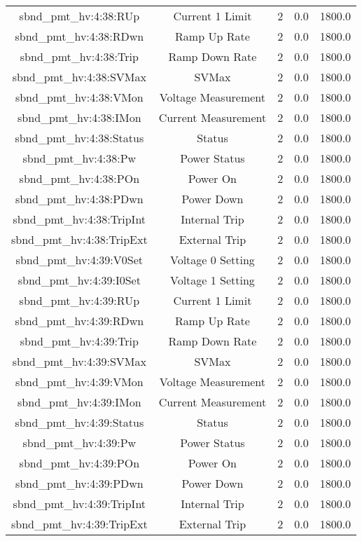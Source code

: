 \begin{center}
\begin{longtable}{c | c c c c }
sbnd\_pmt\_hv:4:38:RUp & Current 1 Limit & 2 & 0.0 & 1800.0\\ 
sbnd\_pmt\_hv:4:38:RDwn & Ramp Up Rate & 2 & 0.0 & 1800.0\\ 
sbnd\_pmt\_hv:4:38:Trip & Ramp Down Rate & 2 & 0.0 & 1800.0\\ 
sbnd\_pmt\_hv:4:38:SVMax & SVMax & 2 & 0.0 & 1800.0\\ 
sbnd\_pmt\_hv:4:38:VMon & Voltage Measurement & 2 & 0.0 & 1800.0\\ 
sbnd\_pmt\_hv:4:38:IMon & Current Measurement & 2 & 0.0 & 1800.0\\ 
sbnd\_pmt\_hv:4:38:Status & Status & 2 & 0.0 & 1800.0\\ 
sbnd\_pmt\_hv:4:38:Pw & Power Status & 2 & 0.0 & 1800.0\\ 
sbnd\_pmt\_hv:4:38:POn & Power On & 2 & 0.0 & 1800.0\\ 
sbnd\_pmt\_hv:4:38:PDwn & Power Down & 2 & 0.0 & 1800.0\\ 
sbnd\_pmt\_hv:4:38:TripInt & Internal Trip & 2 & 0.0 & 1800.0\\ 
sbnd\_pmt\_hv:4:38:TripExt & External Trip & 2 & 0.0 & 1800.0\\ 
sbnd\_pmt\_hv:4:39:V0Set & Voltage 0 Setting & 2 & 0.0 & 1800.0\\ 
sbnd\_pmt\_hv:4:39:I0Set & Voltage 1 Setting & 2 & 0.0 & 1800.0\\ 
sbnd\_pmt\_hv:4:39:RUp & Current 1 Limit & 2 & 0.0 & 1800.0\\ 
sbnd\_pmt\_hv:4:39:RDwn & Ramp Up Rate & 2 & 0.0 & 1800.0\\ 
sbnd\_pmt\_hv:4:39:Trip & Ramp Down Rate & 2 & 0.0 & 1800.0\\ 
sbnd\_pmt\_hv:4:39:SVMax & SVMax & 2 & 0.0 & 1800.0\\ 
sbnd\_pmt\_hv:4:39:VMon & Voltage Measurement & 2 & 0.0 & 1800.0\\ 
sbnd\_pmt\_hv:4:39:IMon & Current Measurement & 2 & 0.0 & 1800.0\\ 
sbnd\_pmt\_hv:4:39:Status & Status & 2 & 0.0 & 1800.0\\ 
sbnd\_pmt\_hv:4:39:Pw & Power Status & 2 & 0.0 & 1800.0\\ 
sbnd\_pmt\_hv:4:39:POn & Power On & 2 & 0.0 & 1800.0\\ 
sbnd\_pmt\_hv:4:39:PDwn & Power Down & 2 & 0.0 & 1800.0\\ 
sbnd\_pmt\_hv:4:39:TripInt & Internal Trip & 2 & 0.0 & 1800.0\\ 
sbnd\_pmt\_hv:4:39:TripExt & External Trip & 2 & 0.0 & 1800.0\\ 

\end{longtable}
\end{center}
